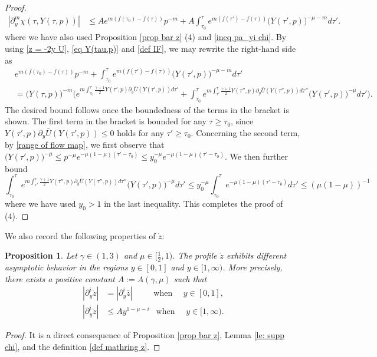\documentclass{article}
\newcommand{\ga}{\gamma}
\newcommand{\pa}{\partial}
\def\beqa{\begin{equation}\begin{aligned}}
\def\eeqa{\end{aligned}\end{equation}}
\numberwithin{equation}{section}
\newtheorem{proposition}[theorem]{Proposition}
\begin{document}
\begin{proof}
\begin{align*}
	 	|\pa_y^m \chi(\tau,Y(\tau,p))| &\leq A e^{m(f(\tau_0)-f(\tau))} p^{-m} +A  \int_{\tau_0}^\tau e^{m( f(\tau')-f(\tau))} \big(Y(\tau',p)\big)^{-\mu-m} d\tau'.
	 \end{align*}
     where we have also used Proposition \ref{prop bar z} (4) and \eqref{ineq pa_yi chi}. 
	 By using \eqref{z = -2y U}, \eqref{eq Y(tau,p)} and \eqref{def IF}, we may rewrite the right-hand side as  
	 \begin{align*}
	 	 &e^{m(f(\tau_0)-f(\tau))} p^{-m} +\int_{\tau_0}^\tau e^{m( f(\tau')-f(\tau))} \big(Y(\tau',p)\big)^{-\mu-m} d\tau'\\
	 &=  \big(Y(\tau,p)\big)^{-m}\Bigg( e^{m\int_{\tau_0}^{\tau} \frac{\ga+1}{2} Y(\tau',p) \pa_y \bar U(Y(\tau',p)) d\tau'} + \int_{\tau_0}^\tau e^{m\int_{\tau'}^{\tau} \frac{\ga+1}{2} Y(\tau'',p) \pa_y \bar U(Y(\tau'',p)) d\tau''} \big(Y(\tau',p)\big)^{-\mu} d\tau' \Bigg).
	 \end{align*}
    The desired bound follows once the boundedness of the terms in the bracket is shown. 
 The first term in the bracket is bounded for any $\tau\geq \tau_0$, since $Y(\tau',p) \pa_y \bar U(Y(\tau',p))\leq0$ holds for any $\tau'\geq \tau_0$. Concerning the second term, by \eqref{range of flow map}, we first observe that $\big(Y(\tau',p)\big)^{-\mu}\leq p^{-\mu} e^{-\mu(1-\mu) (\tau'-\tau_0)} \le y_0^{-\mu} e^{-\mu(1-\mu) (\tau'-\tau_0)}  $. 
	 We then further bound
	 \[
	 	 \int_{\tau_0}^\tau e^{m\int_{\tau'}^{\tau} \frac{\ga+1}{2} Y(\tau'',p) \pa_y \bar U(Y(\tau'',p)) d\tau''} \big(Y(\tau',p)\big)^{-\mu} d\tau' \leq y_0^{-\mu} \int_{\tau_0}^\tau e^{-\mu(1-\mu) (\tau'-\tau_0)} d\tau' \le (\mu(1-\mu))^{-1}
	 \]
where we have used $y_0>1$ in the last inequality. 
     This completes the proof of (4). 
\end{proof}


We also record %
the following properties of $\mathring z$: 
\begin{proposition}\label{prop: mathring z}
Let $\ga\in(1,3)$ and $\mu\in[\frac12,1)$. The profile $\mathring z$ exhibits different asymptotic behavior in the regions $y\in[0,1]$ and $y\in[1,\infty)$. More precisely, there exists a positive constant $A:=A(\ga, \mu)$ such that
    	\beqa |\pa_y^i\mathring z|&=|\pa_y^i \bar z | \qquad \  \text{ when }\quad y\in[0,1],\\
    |\pa_y^i \mathring z| &\leq A y^{1-\mu-i} \ \  \text{ when }\quad y\in[1,\infty).\label{profile be}
    \eeqa
\end{proposition}
\begin{proof}
	It is a direct consequence of Proposition \ref{prop bar z}, Lemma \ref{le: supp chi}, and the definition \eqref{def mathring z}.
\end{proof} 
\end{document}

